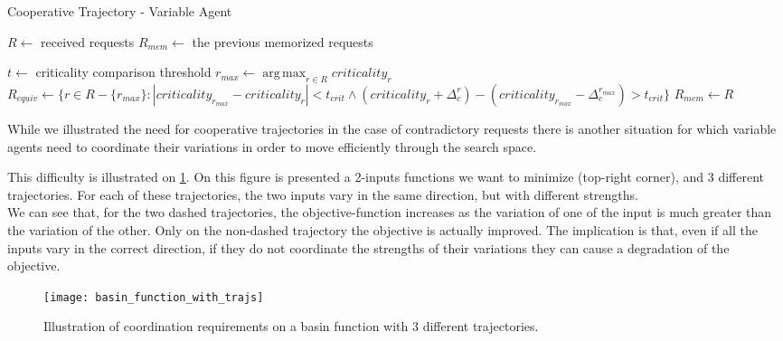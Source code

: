\begin{algorithm}
\caption{Cooperative Trajectory - Variable Agent}
\label{algo_cooperative_trajectory_variable}
	$R \leftarrow $ received requests\;
	$R_{mem} \leftarrow $ the previous memorized requests\;
	
	$t \leftarrow$ criticality comparison threshold\;
	\BlankLine
	\BlankLine
	$r_{max} \leftarrow \displaystyle\operatorname*{arg\,max}_{r \in R}criticality_r$\;
	$R_{equiv} \leftarrow \{ r \in R-\{r_{max}\}: | criticality_{r_{max}} - criticality_{r} | < t_{crit} 		\wedge 	(criticality_{r} + \Delta_c^{r}) - (criticality_{r_{max}} - \Delta_c^{r_{max}}) > t_{crit}\} $\;
	\BlankLine
	$R_{mem} \leftarrow R$\;
\end{algorithm}

While we illustrated the need for cooperative trajectories in the case of contradictory requests there is another situation for which variable agents need to coordinate their variations in order to move efficiently through the search space. 

This difficulty is illustrated on \figurename{} \ref{basin_fun_illustration}. On this figure is presented a 2-inputs functions we want to minimize (top-right corner), and 3 different trajectories. For each of these trajectories, the two inputs vary in the same direction, but with different strengths.\\
We can see that, for the two dashed trajectories, the objective-function increases as the variation of one of the input is much greater than the variation of the other. Only on the non-dashed trajectory the objective is actually improved. The implication is that, even if all the inputs vary in the correct direction, if they do not coordinate the strengths of their variations they can cause a degradation of the objective.

\begin{figure}
\centering
\texttt{[image: basin\_function\_with\_trajs]}
\caption{Illustration of coordination requirements on a basin function with 3 different trajectories.}\label{basin_fun_illustration}
\end{figure}

